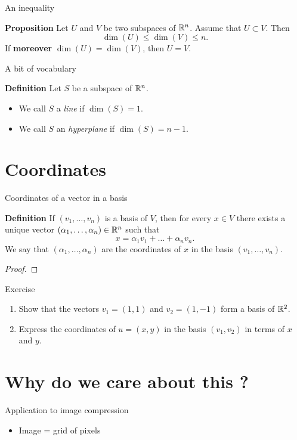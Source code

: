 \documentclass{beamer}
\begin{document}
\begin{frame}[t]{An inequality}
	\begin{block}{\bf Proposition}
		Let	$U$ and $V$ be two subspaces of $\mathbb{R}^n$. Assume that $U \subset V$. Then
		$$
		\dim(U) \leq \dim(V) \leq n.
		$$
		If \textbf{moreover} $\dim(U) = \dim(V)$, then $U = V$.
	\end{block}
\end{frame}

\begin{frame}[t]{A bit of vocabulary}
	\begin{block}{\bf Definition}
		Let $S$ be a subspace of $\mathbb{R}^n$.
		\begin{itemize}
			\item We call $S$ a \emph{line} if $\dim(S) = 1$.
			\item We call $S$ an \emph{hyperplane} if $\dim(S) = n-1$.
		\end{itemize}
	\end{block}
\end{frame}

\section{Coordinates}
\begin{frame}[t]{Coordinates of a vector in a basis}
	\vspace{-0.4cm}
	\begin{block}{\bf Definition}
		If $(v_1, \dots, v_n)$ is a basis of $V$, then for every $x \in V$ there exists a unique vector $(\alpha_1, \dots, \alpha_n) \in \mathbb{R}^n$ such that
		$$
		x = \alpha_1 v_1 + \dots + \alpha_n v_n.
		$$
		We say that $(\alpha_1, \dots, \alpha_n)$ are the coordinates of $x$ in the basis $(v_1, \dots, v_n)$.
	\end{block}
\begin{proof}
	\vspace{2.5cm}
	\vfill
\end{proof}
\end{frame}

\begin{frame}[t]{Exercise}
	\vspace{-0.8cm}
	\begin{exampleblock}{}
		\begin{enumerate}
	\item Show that the vectors $v_1 = (1,1)$ and $v_2=(1,-1)$ form a basis of $\mathbb{R}^2$.
	\item Express the coordinates of $u=(x,y)$ in the basis $(v_1,v_2)$ in terms of $x$ and $y$.
		\end{enumerate}
	\end{exampleblock}
	\pause
\end{frame}

\section{Why do we care about this ?}
\begin{frame}[t]{Application to image compression}
	\begin{itemize}
	\item Image = grid of pixels
\end{itemize}
\end{frame}
\end{document}
